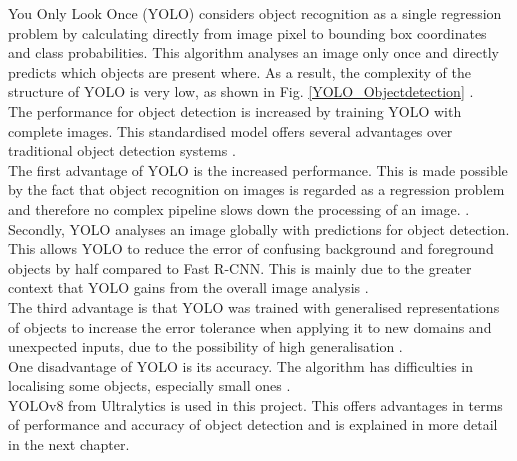 {	\glqq You Only Look Once\grqq{} (YOLO) considers object recognition as a single regression problem by calculating directly from image pixel to bounding box coordinates and class probabilities. This algorithm analyses an image only once and directly predicts which objects are present where. As a result, the complexity of the structure of YOLO is very low, as shown in Fig. \ref{YOLO_Objectdetection} \citep{Redmon2016}. \\
	The performance for object detection is increased by training YOLO with complete images. This standardised model offers several advantages over traditional object detection systems \citep{Redmon2016}. \\
	The first advantage of YOLO is the increased performance. This is made possible by the fact that object recognition on images is regarded as a regression problem and therefore no complex pipeline slows down the processing of an image.  \citep{Redmon2016}. 
	Secondly, YOLO analyses an image globally with predictions for object detection. This allows YOLO to reduce the error of confusing background and foreground objects by half compared to Fast R-CNN. This is mainly due to the greater context that YOLO gains from the overall image analysis \citep{Redmon2016}. \\
	The third advantage is that YOLO was trained with generalised representations of objects to increase the error tolerance when applying it to new domains and unexpected inputs, due to the possibility of high generalisation \citep{Redmon2016}. \\
	One disadvantage of YOLO is its accuracy. The algorithm has difficulties in localising some objects, especially small ones \citep{Redmon2016}. \\

	YOLOv8 from Ultralytics is used in this project. This offers advantages in terms of performance and accuracy of object detection and is explained in more detail in the next chapter. 
	} 

